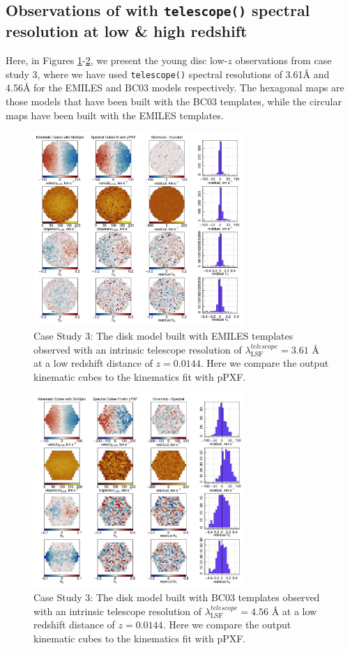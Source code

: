 \documentclass[
  journal=pasa,
  manuscript=research-paper, %
  year=2020,
  volume=37,
]{cup-journal}
\newcommand{\telescope}[1]{\texttt{telescope()}#1}
\begin{document}
\subsection{Observations of with \telescope{} spectral resolution at low \& high redshift}
\label{app:cs3}

Here, in Figures \ref{fig:cs3_disk_lowz_EMILES}-\ref{fig:cs3_disk_lowz_BC03}, we present the young disc low-$z$ observations from case study 3, where we have used \telescope{} spectral resolutions of 3.61\AA{} and 4.56\AA{} for the EMILES and BC03 models respectively. The hexagonal maps are those models that have been built with the BC03 templates, while the circular maps have been built with the EMILES templates. 

\begin{figure}
    \centering
    \includegraphics[keepaspectratio, width=8cm]{Figures/cs3_disk_velocities_lowz_fwhm_EMILES.jpeg}
    \caption{Case Study 3: The disk model built with EMILES templates observed with an intrinsic telescope resolution of  $\lambda_{\text{LSF}}^{telescope} = 3.61$ \AA{} at a low redshift distance of $z = 0.0144$. Here we compare the output kinematic cubes to the kinematics fit with pPXF.}
    \label{fig:cs3_disk_lowz_EMILES}
\end{figure}

\begin{figure}
    \centering
    \includegraphics[keepaspectratio, width=8cm]{Figures/cs3_disk_velocities_lowz_fwhm_BC03.jpeg}
    \caption{Case Study 3: The disk model built with BC03 templates observed with an intrinsic telescope resolution of  $\lambda_{\text{LSF}}^{telescope} = 4.56$ \AA{} at a low redshift distance of $z = 0.0144$. Here we compare the output kinematic cubes to the kinematics fit with pPXF.}
    \label{fig:cs3_disk_lowz_BC03}
\end{figure}
\end{document}
